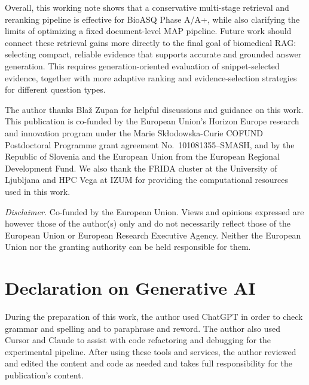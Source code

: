 \documentclass[
]{ceurart}
\begin{document}
Overall, this working note shows that a conservative multi-stage retrieval and reranking pipeline is effective for BioASQ Phase A/A+, while also clarifying the limits of optimizing a fixed document-level MAP pipeline. Future work should connect these retrieval gains more directly to the final goal of biomedical RAG: selecting compact, reliable evidence that supports accurate and grounded answer generation. This requires generation-oriented evaluation of snippet-selected evidence, together with more adaptive ranking and evidence-selection strategies for different question types.

\begin{acknowledgments}
  The author thanks Bla\v{z} Zupan for helpful discussions and guidance on this work. This publication is co-funded by the European Union's Horizon Europe research and innovation program under the Marie Sk\l{}odowska-Curie COFUND Postdoctoral Programme grant agreement No.~101081355--SMASH, and by the Republic of Slovenia and the European Union from the European Regional Development Fund. We also thank the FRIDA cluster at the University of Ljubljana and HPC Vega at IZUM for providing the computational resources used in this work.

  \emph{Disclaimer.} Co-funded by the European Union. Views and opinions expressed are however those of the author(s) only and do not necessarily reflect those of the European Union or European Research Executive Agency. Neither the European Union nor the granting authority can be held responsible for them.
\end{acknowledgments}

\section*{Declaration on Generative AI}
During the preparation of this work, the author used ChatGPT in order to check grammar and spelling and to paraphrase and reword. The author also used Cursor
and Claude to assist with code
refactoring and debugging for the experimental pipeline. After using these tools and services,
the author reviewed and edited the content and code as needed and takes
full responsibility for the publication's content.



\end{document}
